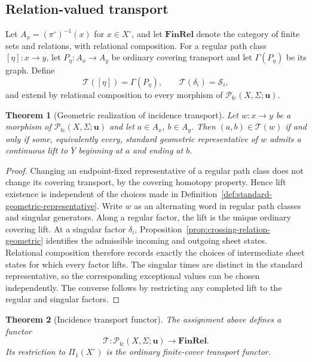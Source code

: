 \documentclass[11pt]{article}
\theoremstyle{plain}
\newtheorem{theorem}{Theorem}[section]
\theoremstyle{definition}
\begin{document}
\subsection{Relation-valued transport}
\label{subsec:crossing-word-transport}

Let $A_x=(\pi^\circ)^{-1}(x)$ for $x\in X^\circ$, and let $\mathbf{FinRel}$ denote the category of finite sets and relations, with relational composition.  For a regular path class $[\eta]:x\to y$, let $P_\eta:A_x\to A_y$ be ordinary
covering transport and let $\Gamma(P_\eta)$ be its graph.  Define
\[
\mathscr T([\eta])=\Gamma(P_\eta),
\qquad
\mathscr T(\delta_i)=\mathcal S_i,
\]
and extend by relational composition to every morphism of
$\mathcal P_{\mathrm{fc}}(X,\Sigma;\mathbf u)$.

\begin{theorem}[Geometric realization of incidence transport]
\label{thm:transport-realization}
Let $w:x\to y$ be a morphism of
$\mathcal P_{\mathrm{fc}}(X,\Sigma;\mathbf u)$ and let $a\in A_x$, $b\in A_y$.
Then $(a,b)\in\mathscr T(w)$ if and only if some, equivalently every,
standard geometric representative of $w$ admits a continuous lift to
$\overline Y$ beginning at $a$ and ending at $b$.
\end{theorem}

\begin{proof}
Changing an endpoint-fixed representative of a regular path class does not change
its covering transport, by the covering homotopy property.  Hence lift existence is
independent of the choices made in Definition~\ref{def:standard-geometric-representative}.
Write $w$ as an alternating word in regular path classes and singular generators.  Along
a regular factor, the lift is the unique ordinary covering lift.  At a singular factor
$\delta_i$, Proposition~\ref{prop:crossing-relation-geometric} identifies the admissible
incoming and outgoing sheet states.  Relational composition therefore records exactly the
choices of intermediate sheet states for which every factor lifts.  The singular times are
distinct in the standard representative, so the corresponding exceptional values can be
chosen independently.  The converse follows by restricting any completed lift to the
regular and singular factors.
\end{proof}

\begin{theorem}[Incidence transport functor]
\label{thm:incidence-transport-functor}
The assignment above defines a functor
\[
\mathscr T:
\mathcal P_{\mathrm{fc}}(X,\Sigma;\mathbf u)
\longrightarrow\mathbf{FinRel}.
\]
Its restriction to $\Pi_1(X^\circ)$ is the ordinary finite-cover transport functor.
\end{theorem}
\end{document}
